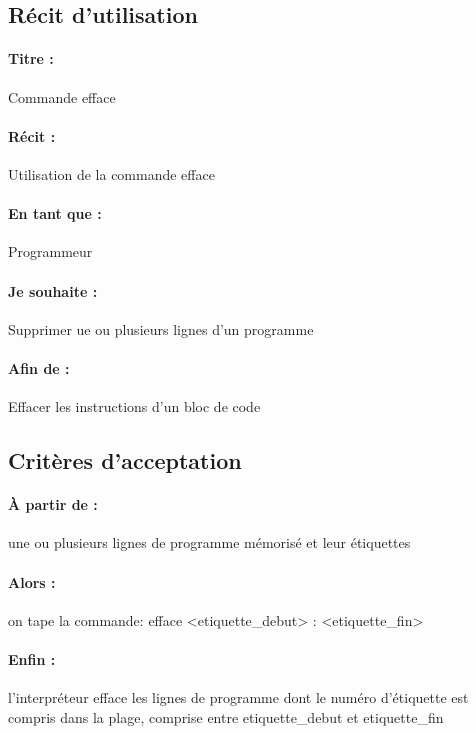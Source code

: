 

    \subsection*{Récit d'utilisation}

    \paragraph{Titre : } Commande efface
    \paragraph{Récit : } Utilisation de la commande efface
    \paragraph{En tant que : } Programmeur
    \paragraph{Je souhaite : } Supprimer ue ou plusieurs lignes d'un programme
    \paragraph{Afin de : } Effacer les instructions d'un bloc de code
    \newpage

    \subsection*{Critères d'acceptation}

    \paragraph{À partir de : } une ou plusieurs lignes de programme mémorisé et leur étiquettes
    \paragraph{Alors : } on tape la commande: efface <etiquette\_debut> : <etiquette\_fin>
    \paragraph{Enfin : } l'interpréteur efface les lignes de programme dont le numéro d'étiquette est compris dans la plage, comprise entre etiquette\_debut et etiquette\_fin
